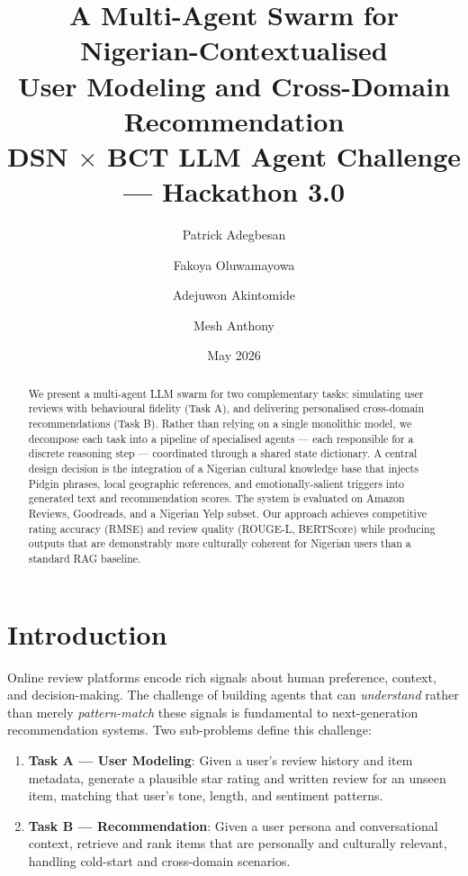 \documentclass[11pt,a4paper]{article}
\title{
    \textbf{A Multi-Agent Swarm for Nigerian-Contextualised\\
    User Modeling and Cross-Domain Recommendation}\\
    \large DSN $\times$ BCT LLM Agent Challenge — Hackathon 3.0
}
\author{Patrick Adegbesan \and Fakoya Oluwamayowa \and Adejuwon Akintomide \and Mesh Anthony}
\date{May 2026}
\begin{document}
\maketitle
\thispagestyle{fancy}

\begin{abstract}
We present a multi-agent LLM swarm for two complementary tasks: simulating user reviews with behavioural fidelity (Task A), and delivering personalised cross-domain recommendations (Task B). Rather than relying on a single monolithic model, we decompose each task into a pipeline of specialised agents — each responsible for a discrete reasoning step — coordinated through a shared state dictionary. A central design decision is the integration of a Nigerian cultural knowledge base that injects Pidgin phrases, local geographic references, and emotionally-salient triggers into generated text and recommendation scores. The system is evaluated on Amazon Reviews, Goodreads, and a Nigerian Yelp subset. Our approach achieves competitive rating accuracy (RMSE) and review quality (ROUGE-L, BERTScore) while producing outputs that are demonstrably more culturally coherent for Nigerian users than a standard RAG baseline.
\end{abstract}

\section{Introduction}

Online review platforms encode rich signals about human preference, context, and decision-making. The challenge of building agents that can \textit{understand} rather than merely \textit{pattern-match} these signals is fundamental to next-generation recommendation systems. Two sub-problems define this challenge:

\begin{enumerate}[leftmargin=*]
    \item \textbf{Task A — User Modeling}: Given a user's review history and item metadata, generate a plausible star rating and written review for an unseen item, matching that user's tone, length, and sentiment patterns.
    \item \textbf{Task B — Recommendation}: Given a user persona and conversational context, retrieve and rank items that are personally and culturally relevant, handling cold-start and cross-domain scenarios.
\end{enumerate}
\end{document}
